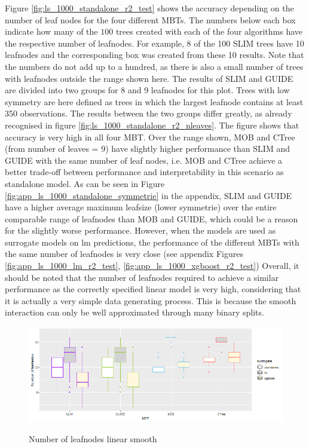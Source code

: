 Figure \ref{fig:ls_1000_standalone_r2_test} shows the accuracy depending on the number of leaf nodes for the four different MBTs.
The numbers below each box indicate how many of the $100$ trees created with each of the four algorithms have the respective number of leafnodes. For example, 8 of the 100 SLIM trees have 10 leafnodes and the corresponding box was created from these 10 results. Note that the numbers do not add up to a hundred, as there is also a small number of trees with leafnodes outside the range shown here. The results of SLIM and GUIDE are divided into two groups for 8 and 9 leafnodes for this plot. Trees with low symmetry are here defined as trees in which the largest leafnode contains at least 350 observations. The results between the two groups differ greatly, as already recognised in figure \ref{fig:ls_1000_standalone_r2_nleaves}.
The figure shows that accuracy is very high in all four MBT. Over the range shown, MOB and CTree (from number of leaves = 9) have slightly higher performance than SLIM and GUIDE with the same number of leaf nodes, i.e. MOB and CTree achieve a better trade-off between performance and interpretability in this scenario as standalone model.
As can be seen in Figure \ref{fig:app_ls_1000_standalone_symmetrie} in the appendix, SLIM and GUIDE have a higher average maximum leafsize (lower symmetrie) over the entire comparable range of leafnodes than MOB and GUIDE, which could be a reason for the slightly worse performance.
However, when the models are used as surrogate models on lm predictions, the performance of the different MBTs with the same number of leafnodes is very close (see appendix Figures \ref{fig:app_ls_1000_lm_r2_test}, \ref{fig:app_ls_1000_xgboost_r2_test})
Overall, it should  be noted that the number of leafnodes required to achieve a similar performance as the correctly specified linear model is very high, considering that it is actually a very simple data generating process. This is because the smooth interaction can only be well approximated through many binary splits. 






\begin{figure}[!htb] 
\caption{Number of leafnodes linear smooth}
    \includegraphics[width=16cm]{Figures/simulations/batchtools/basic_scenarios/linear_smooth/ls_1000_int.png}
    \label{fig:ls_1000_int}
\end{figure} 


